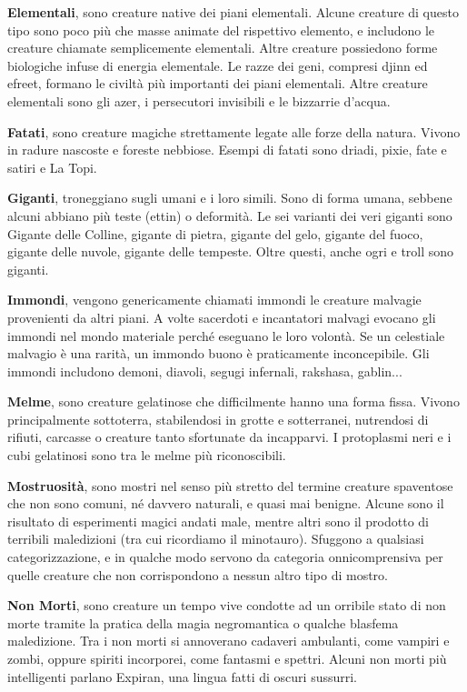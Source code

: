 \begin{multicols}{2}
\smallskip\textbf{Elementali}, sono creature native dei piani elementali. Alcune creature di questo tipo sono poco più che masse animate del rispettivo elemento, e includono le creature chiamate semplicemente elementali. Altre creature possiedono forme biologiche infuse di energia elementale. Le razze dei geni, compresi djinn ed efreet, formano le civiltà più importanti dei piani elementali. Altre creature elementali sono gli azer, i persecutori invisibili e le bizzarrie d'acqua.

\smallskip\textbf{Fatati}, sono creature magiche strettamente legate alle forze della natura. Vivono in radure nascoste e foreste nebbiose. Esempi di fatati sono driadi, pixie, fate e satiri e La Topi.

\smallskip\textbf{Giganti}, troneggiano sugli umani e i loro simili. Sono di forma umana, sebbene alcuni abbiano più teste (ettin) o deformità. Le sei varianti dei veri giganti sono Gigante delle Colline, gigante di pietra, gigante del gelo, gigante del fuoco, gigante delle nuvole, gigante delle tempeste. Oltre questi, anche ogri e troll sono giganti.

\smallskip\textbf{Immondi}, vengono genericamente chiamati immondi le creature malvagie provenienti da altri piani. A volte sacerdoti e incantatori malvagi evocano gli immondi nel mondo materiale perché eseguano le loro volontà. Se un celestiale malvagio è una rarità, un immondo buono è praticamente inconcepibile. Gli immondi includono demoni, diavoli, segugi infernali, rakshasa, gablin...

\smallskip\textbf{Melme}, sono creature gelatinose che difficilmente hanno una forma fissa. Vivono principalmente sottoterra, stabilendosi in grotte e sotterranei, nutrendosi di rifiuti, carcasse o creature tanto sfortunate da incapparvi. I protoplasmi neri e i cubi gelatinosi sono tra le melme più riconoscibili.

\smallskip\textbf{Mostruosità}, sono mostri nel senso più stretto del termine creature spaventose che non sono comuni, né davvero naturali, e quasi mai benigne. Alcune sono il risultato di esperimenti magici andati male, mentre altri sono il prodotto di terribili maledizioni (tra cui ricordiamo il minotauro). Sfuggono a qualsiasi categorizzazione, e in qualche modo servono da categoria onnicomprensiva per quelle creature che non corrispondono a nessun altro tipo di mostro.

\smallskip\textbf{Non Morti}, sono creature un tempo vive condotte ad un orribile stato di non morte tramite la pratica della magia negromantica o qualche blasfema maledizione. Tra i non morti si annoverano cadaveri ambulanti, come vampiri e zombi, oppure spiriti incorporei, come fantasmi e spettri. Alcuni non morti più intelligenti parlano Expiran, una lingua fatti di oscuri sussurri.


\end{multicols}
